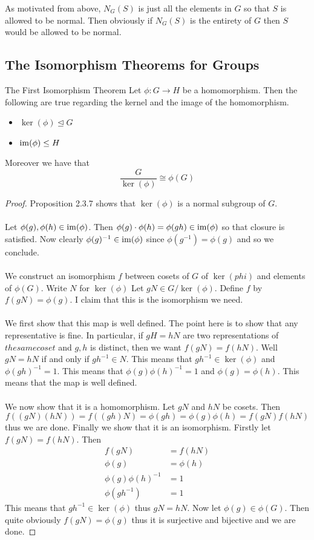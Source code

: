 \documentclass[a4paper]{article}
\begin{document}
As motivated from above, $N_G(S)$ is just all the elements in $G$ so that $S$ is allowed to be normal. Then obviously if $N_G(S)$ is the entirety of $G$ then $S$ would be allowed to be normal. 

\subsection{The Isomorphism Theorems for Groups}
\begin{thm}{The First Isomorphism Theorem}{} Let $\phi:G\to H$ be a homomorphism. Then the following are true regarding the kernel and the image of the homomorphism. 
\begin{itemize}
\item $\ker(\phi)\trianglelefteq G$
\item $\operatorname{im}(\phi)\leq H$
\end{itemize} 
Moreover we have that $$\frac{G}{\ker(\phi)}\cong\phi(G)$$ \tcbline
\begin{proof}
Proposition 2.3.7 shows that $\ker(\phi)$ is a normal subgroup of $G$. \\~\\

Let $\phi(g),\phi(h)\in\operatorname{im}(\phi)$. Then $\phi(g)\cdot\phi(h)=\phi(gh)\in\operatorname{im}(\phi)$ so that closure is satisfied. Now clearly $\phi(g)^{-1}\in\operatorname{im}(\phi)$ since $\phi(g^{-1})=\phi(g)$ and so we conclude. \\~\\

We construct an isomorphism $f$ between cosets of $G$ of $\ker(phi)$ and elements of $\phi(G)$. Write $N$ for $\ker(\phi)$ Let $gN\in G/\ker(\phi)$. Define $f$ by $f(gN)=\phi(g)$. I claim that this is the isomorphism we need. \\~\\
We first show that this map is well defined. The point here is to show that any representative is fine. In particular, if $gH=hN$ are two representations of $the same coset$ and $g,h$ is distinct, then we want $f(gN)=f(hN)$. Well $gN=hN$ if and only if $gh^{-1}\in N$. This means that $gh^{-1}\in\ker(\phi)$ and $\phi(gh)^{-1}=1$. This means that $\phi(g)\phi(h)^{-1}=1$ and $\phi(g)=\phi(h)$. This means that the map is well defined. \\~\\
We now show that it is a homomorphism. Let $gN$ and $hN$ be cosets. Then $$f((gN)(hN))=f((gh)N)=\phi(gh)=\phi(g)\phi(h)=f(gN)f(hN)$$ thus we are done. Finally we show that it is an isomorphism. Firstly let $f(gN)=f(hN)$. Then
\begin{align*}
f(gN)&=f(hN)\\
\phi(g)&=\phi(h)\\
\phi(g)\phi(h)^{-1}&=1\\
\phi(gh^{-1})&=1
\end{align*}
This means that $gh^{-1}\in\ker(\phi)$ thus $gN=hN$. Now let $\phi(g)\in\phi(G)$. Then quite obviously $f(gN)=\phi(g)$ thus it is surjective and bijective and we are done. 
\end{proof}
\end{thm}
\end{document}
